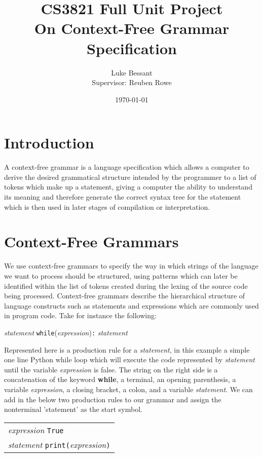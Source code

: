 \documentclass[a4paper, 11pt]{article}
\title{\textbf{CS3821 Full Unit Project}\\On Context-Free Grammar Specification}
\author{Luke Bessant\\Supervisor: Reuben Rowe}
\date{\today}
\begin{document}
\maketitle
\thispagestyle{title}
\newpage

\tableofcontents
\newpage

\section{Introduction}
A context-free grammar is a language specification which allows a computer to derive the desired grammatical structure intended by the programmer to a list of tokens which make up a statement, giving a computer the ability to understand its meaning and therefore generate the correct syntax tree for the statement which is then used in later stages of compilation or interpretation.

\section{Context-Free Grammars}
We use context-free grammars to specify the way in which strings of the language we want to process should be structured, using patterns which can later be identified within the list of tokens created during the lexing of the source code being processed. Context-free grammars describe the hierarchical structure of language constructs such as statements and expressions which are commonly used in program code. Take for instance the following:

\begin{center}
	\textit{statement} \textbf{\textrightarrow} \texttt{while}(\textit{expression})\texttt{:} \textit{statement}
\end{center}

Represented here is a production rule for a \textit{statement}, in this example a simple one line Python while loop which will execute the code represented by \textit{statement} until the variable \textit{expression} is false. The string on the right side is a concatenation of the keyword \textbf{while}, a terminal, an opening parenthesis, a variable \textit{expression}, a closing bracket, a colon, and a variable \textit{statement}. We can add in the below two production rules to our grammar and assign the nonterminal 'statement' as the start symbol.

\begin{center}
	\begin{tabular}{l}
		\textit{expression} \textbf{\textrightarrow} \texttt{True} \\
		\textit{statement} \textbf{\textrightarrow} \texttt{print(}\textit{expression}\texttt{)}
	\end{tabular}
\end{center}
\end{document}

